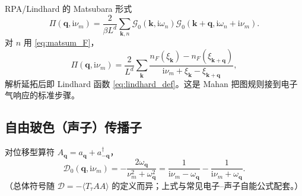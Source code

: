 \begin{example}[极化气泡中的费米圈]
RPA/Lindhard 的 Matsubara 形式
\begin{equation}
  \Pi(\mathbf{q},\mathrm{i}\nu_m)
  =\frac{2}{\beta L^d}
  \sum_{\mathbf{k},n}
  \mathcal{G}_0(\mathbf{k},\mathrm{i}\omega_n)
  \mathcal{G}_0(\mathbf{k}+\mathbf{q},\mathrm{i}\omega_n+\mathrm{i}\nu_m).
\end{equation}
对 $n$ 用 \eqref{eq:matsum_F}，
\begin{equation}
  \Pi(\mathbf{q},\mathrm{i}\nu_m)
  =\frac{2}{L^d}
  \sum_{\mathbf{k}}
  \frac{n_F(\xi_{\mathbf{k}})-n_F(\xi_{\mathbf{k}+\mathbf{q}})}
  {\mathrm{i}\nu_m+\xi_{\mathbf{k}}-\xi_{\mathbf{k}+\mathbf{q}}},
\label{eq:Pi_matsum}
\end{equation}
解析延拓后即 Lindhard 函数 \eqref{eq:lindhard_def}。这是 Mahan 把图规则接到电子气响应的标准步骤。
\end{example}

\subsection{自由玻色（声子）传播子}

对位移型算符 $A_{\mathbf{q}}=a_{\mathbf{q}}+a_{-\mathbf{q}}^\dagger$，
\begin{equation}
  \mathcal{D}_0(\mathbf{q},\mathrm{i}\nu_m)
  =-\frac{2\omega_{\mathbf{q}}}{\nu_m^2+\omega_{\mathbf{q}}^2}
  =\frac{1}{\mathrm{i}\nu_m-\omega_{\mathbf{q}}}
  -\frac{1}{\mathrm{i}\nu_m+\omega_{\mathbf{q}}}.
\label{eq:D0}
\end{equation}
（总体符号随 $\mathcal{D}=-\langle T_\tau A A\rangle$ 的定义而异；上式与常见电子--声子自能公式配套。）
